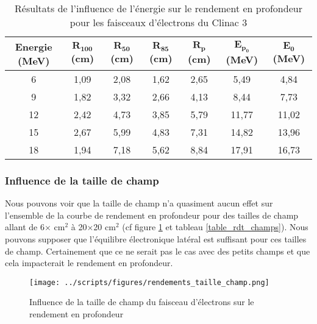 \documentclass{article}
\begin{document}
\begin{table}[h]
  \centering
  \begin{tabular}{ccccccc}
  \toprule
  \textbf{Energie (MeV)} & $\mathbf{R_{100}}$ \textbf{(cm)} & $\mathbf{R_{50}}$ \textbf{(cm)} & $\mathbf{R_{85}}$ \textbf{(cm)} & $\mathbf{R_p}$ \textbf{(cm)} & $\mathbf{E_{p_0}}$ \textbf{(MeV)} & $\mathbf{E_0}$ \textbf{(MeV)} \\ \toprule
  6 & 1,09 & 2,08 & 1,62 & 2,65 & 5,49 & 4,84 \\
  9 & 1,82 & 3,32 & 2,66 & 4,13 & 8,44 & 7,73 \\
  12 & 2,42 & 4,73 & 3,85 & 5,79 & 11,77 & 11,02 \\
  15 & 2,67 & 5,99 & 4,83 & 7,31 & 14,82 & 13,96 \\
  18 & 1,94 & 7,18 & 5,62 & 8,84 & 17,91 & 16,73 \\ \bottomrule
  \end{tabular}
  \caption{Résultats de l'influence de l'énergie sur le rendement en profondeur pour les faisceaux d'électrons du Clinac 3}
  \label{table_rdt_energies}
\end{table}

\subsubsection{Influence de la taille de champ}

Nous pouvons voir que la taille de champ n'a quasiment aucun effet sur l'ensemble de la courbe de rendement en profondeur pour des tailles de champ allant de 6$\times$ cm$^2$ à 20$\times$20 cm$^2$ (cf figure \ref*{fig_rdt_champ} et tableau \ref*{table_rdt_champs}). Nous pouvons supposer que l'équilibre électronique latéral est suffisant pour ces tailles de champ. Certainement que ce ne serait pas le cas avec des petits champs et que cela impacterait le rendement en profondeur.

\begin{figure}[h]
  \centering
  \texttt{[image: ../scripts/figures/rendements\_taille\_champ.png]}
  \caption{Influence de la taille de champ du faisceau d'électrons sur le rendement en profondeur}
  \label{fig_rdt_champ}
\end{figure}
\end{document}
